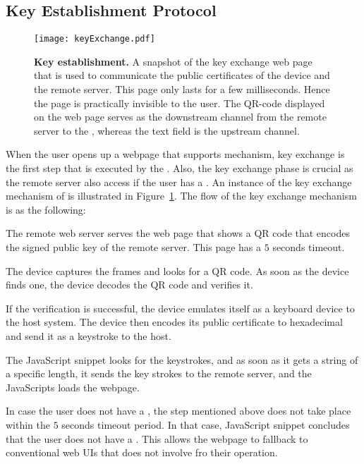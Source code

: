 \subsection{Key Establishment Protocol}
\label{sec:systemDesign:keyEstablishment}

\begin{figure}[t]
\centering
\texttt{[image: keyExchange.pdf]}
\caption{\textbf{Key establishment.} A snapshot of the key exchange web page that is used to communicate the public certificates of the device and the remote server. This page only lasts for a few milliseconds. Hence the page is practically invisible to the user. The QR-code displayed on the web page serves as the downstream channel from the remote server to the \device, whereas the text field is the upstream channel.}
\label{fig:keyExchange}
\centering
\end{figure}

When the user opens up a webpage that supports \name mechanism, key exchange is the first step that is executed by the \device. Also, the key exchange phase is crucial as the remote server also access if the user has a \device. An instance of the key exchange mechanism of \name is illustrated in Figure~\ref{fig:keyExchange}. The flow of the key exchange mechanism is as the following:

\begin{mylist}
  \item The remote web server serves the web page that shows a QR code that encodes the signed public key of the remote server. This page has a $5$ seconds timeout.
  \item The device captures the frames and looks for a QR code. As soon as the device finds one, the device decodes the QR code and verifies it.
  \item If the verification is successful, the device emulates itself as a keyboard device to the host system. The device then encodes its public certificate to hexadecimal and send it as a keystroke to the host.
  \item The \name  JavaScript snippet looks for the keystrokes, and as soon as it gets a string of a specific length, it sends the key strokes to the remote server, and the \name JavaScripts loads the webpage.
  \item In case the user does not have a \device, the step mentioned above does not take place within the $5$ seconds timeout period. In that case, \name JavaScript snippet concludes that the user does not have a \device. This allows the webpage to fallback to conventional web UIs that does not involve \device fro their operation.
\end{mylist}

